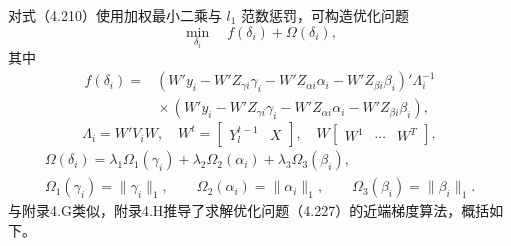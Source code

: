 对式（4.210）使用加权最小二乘与 $l_1$ 范数惩罚，可构造优化问题
\begin{equation}
\min_{\delta_i}\quad f(\delta_i)+\Omega(\delta_i),\tag{4.227}
\end{equation}
其中
\[
\begin{aligned}
f(\delta_i)={}&
(W'y_i-W'Z_{\gamma i}\gamma_i-W'Z_{\alpha i}\alpha_i-W'Z_{\beta i}\beta_i)'\Lambda_i^{-1}\\
&{}\times(W'y_i-W'Z_{\gamma i}\gamma_i-W'Z_{\alpha i}\alpha_i-W'Z_{\beta i}\beta_i),
\end{aligned}
\]
\[
\Lambda_i=W'V_iW,\quad W^t=\begin{bmatrix}Y_l^{t-1}&X\end{bmatrix},\quad
W\begin{bmatrix}W^1&\cdots&W^T\end{bmatrix},
\]
\[
\begin{gathered}
\Omega(\delta_i)=\lambda_1\Omega_1(\gamma_i)+\lambda_2\Omega_2(\alpha_i)+\lambda_3\Omega_3(\beta_i),\\
\Omega_1(\gamma_i)=\|\gamma_i\|_1,\qquad
\Omega_2(\alpha_i)=\|\alpha_i\|_1,\qquad
\Omega_3(\beta_i)=\|\beta_i\|_1.
\end{gathered}
\]
与附录4.G类似，附录4.H推导了求解优化问题（4.227）的近端梯度算法，概括如下。

